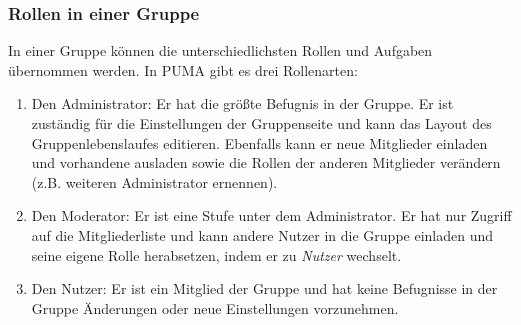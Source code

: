 \subsubsection{Rollen in einer Gruppe}
In einer Gruppe können die unterschiedlichsten Rollen und Aufgaben übernommen werden. In PUMA gibt es drei Rollenarten:
\begin{enumerate}
    \item Den Administrator: Er hat die größte Befugnis in der Gruppe. Er ist zuständig für die Einstellungen der Gruppenseite und kann das Layout des Gruppenlebenslaufes editieren. Ebenfalls kann er neue Mitglieder einladen und vorhandene ausladen sowie die Rollen der anderen Mitglieder verändern (z.B. weiteren Administrator ernennen).
    \item Den Moderator: Er ist eine Stufe unter dem Administrator. Er hat nur Zugriff auf die Mitgliederliste und kann andere Nutzer in die Gruppe einladen und seine eigene Rolle herabsetzen, indem er zu \textit{Nutzer} wechselt.
    \item Den Nutzer: Er ist ein Mitglied der Gruppe und hat keine Befugnisse in der Gruppe Änderungen oder neue Einstellungen vorzunehmen.
\end{enumerate}


